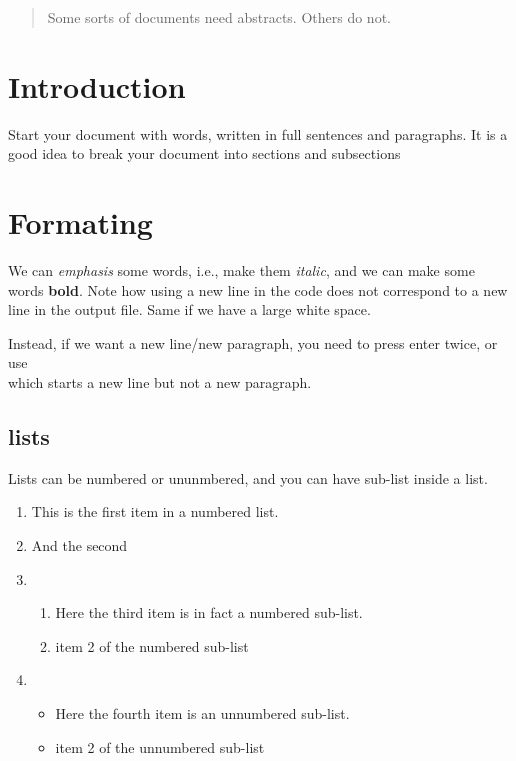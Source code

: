 \documentclass[a4paper,11pt]{article}
\theoremstyle{definition}
\begin{document}

	

\begin{abstract}
Some sorts of documents need abstracts. Others do not.
\end{abstract}


\section{Introduction}

Start your document with words, written in full sentences and paragraphs.
It is a good idea to break your document into sections and subsections

\section{Formating}

We can \emph{emphasis} some words, i.e., make them \emph{italic}, and we can make some words \textbf{bold}.
Note how using a new line in the code does not correspond to a new line in the output file.
Same if we have        a           large                white                   space.

Instead, if we want a new line/new paragraph, you need to press enter twice, or use \\
which starts a new line but not a new paragraph.

\subsection{lists}

Lists can be numbered or ununmbered, and you can have sub-list inside a list.

\begin{enumerate}
	\item This is the first item in a numbered list.

	\item And the second
	
	\item 
	\begin{enumerate}
		\item Here the third item is in fact a numbered sub-list.
		\item item 2 of the numbered sub-list
	\end{enumerate}

	\item 
	\begin{itemize}
		\item Here the fourth item is an unnumbered sub-list.
		\item item 2 of the unnumbered sub-list
	\end{itemize}
\end{enumerate}
\end{document}
